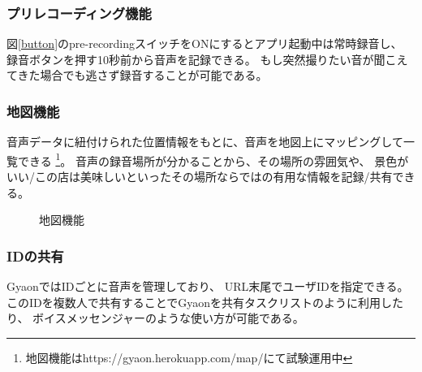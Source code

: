 \subsubsection{プリレコーディング機能}
図\ref{button}のpre-recordingスイッチをONにするとアプリ起動中は常時録音し、
録音ボタンを押す10秒前から音声を記録できる。
もし突然撮りたい音が聞こえてきた場合でも逃さず録音することが可能である。

\subsubsection{地図機能}
音声データに紐付けられた位置情報をもとに、音声を地図上にマッピングして一覧できる
\footnote{\textsf{地図機能はhttps://gyaon.herokuapp.com/map/にて試験運用中}}。
音声の録音場所が分かることから、その場所の雰囲気や、
景色がいい/この店は美味しいといったその場所ならではの有用な情報を記録/共有できる。

\begin{figure}[H]
\centering
{}
\caption{地図機能}
\label{map}
\end{figure}

\subsubsection{IDの共有}
GyaonではIDごとに音声を管理しており、
URL末尾でユーザIDを指定できる。
このIDを複数人で共有することでGyaonを共有タスクリストのように利用したり、
ボイスメッセンジャーのような使い方が可能である。

